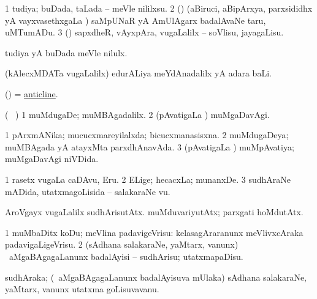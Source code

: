 \bentry
{} 
\gl{\sakirx}
\expl{}
\bmng
\bnum
\num{1} tudiya; buDada, taLada -- meVle nililxsu. 
\num{2} (\AmA) (aBiruci, aBipArxya, parxsididhx yA vayxvasethxgaLa \vi) saMpUNaR yA AmUlAgarx badalAvaNe taru, uMTumADu. 
\num{3} (\AmA) sapxdheR, vAyxpAra, \mo vugaLalilx -- soVlisu, jayagaLisu. 
\enum
\emng

\noindent
\gl{\akirx}
\expl{}
\bmng
tudiya yA buDada meVle nilulx. 
\emng
\eentry

\bentry
{} 
\gl{\kirxvi}
\expl{}
\bmng
(kAlecxMDATa \mo vugaLalilx) edurALiya meYdAnadalilx yA adara baLi. 
\emng
\eentry

\bentry
{} 
\gl{\nA}
\expl{}
\bmng
(\BUvi) = \hyperref{kandict_a.pdf}{A}{anticline}{anticline}. 
\emng
\eentry

\bentry
{} 
\gl{\kirxvi}
\expl{}
\bmng
(\sA\  ) 
\bnum
\num{1} muMdugaDe; muMBAgadalilx. 
\num{2} (pAvatigaLa \vi) muMgaDavAgi. 
\enum
\emng
\eentry

\bentry
{} 
\gl{\gu}
\expl{}
\bmng
\bnum
\num{1} pArxmANika; mucucxmareyilalxda; bicucxmanasisxna. 
\num{2} muMdugaDeya; muMBAgada yA atayxMta parxdhAnavAda. 
\num{3} (pAvatigaLa \vi) muMpAvatiya; muMgaDavAgi niVDida. 
\enum
\emng
\eentry

\bentry
{} 
\gl{\nA}
\expl{}
\bmng
\bnum
\num{1} rasetx \mo vugaLa caDAvu, Eru. 
\num{2} ELige; hecacxLa; munanxDe. 
\num{3} sudhAraNe mADida, utatxmagoLisida -- salakaraNe \mo vu. 
\enum
\emng

\noindent
\gl{\pagu}
\expl{}
\bmng
{} 
\banum
{} AroVgayx \mo vugaLalilx sudhArisutAtx. 
 muMduvariyutAtx; parxgati hoMdutAtx. 
\eanum
\emng
\eentry

\bentry
{} 
\gl{\sakirx}
\expl{}
\bmng
\bnum
\num{1} muMbaDitx koDu; meVlina padavigeVrisu:  kelasagAraranunx meVlivxcAraka padavigaLigeVrisu. 
\num{2} (sAdhana salakaraNe, yaMtarx, \mo vanunx) \kanmu\ aMgaBAgagaLanunx badalAyisi -- sudhArisu; utatxmapaDisu. 
\enum
\emng
\eentry

\bentry
{} 
\gl{\nA}
\expl{}
\bmng
sudhAraka; (\kanmu\ aMgaBAgagaLanunx badalAyisuva mUlaka) sAdhana salakaraNe, yaMtarx, \mo vanunx utatxma goLisuvavanu. 
\emng
\eentry

